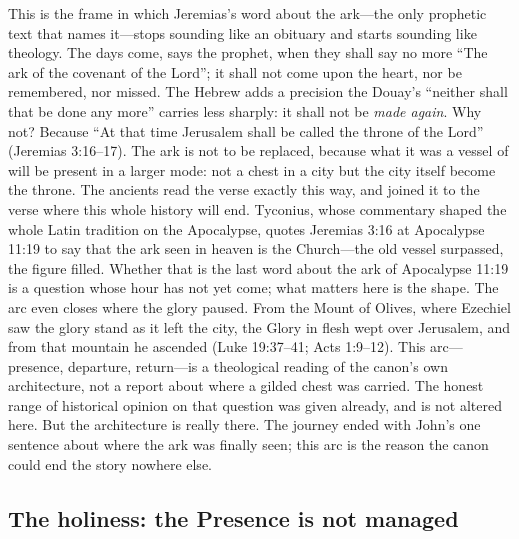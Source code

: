 This is the frame in which Jeremias's word about the ark---the only
prophetic text that names it---stops sounding like an obituary and
starts sounding like theology. The days come, says the prophet, when
they shall say no more ``The ark of the covenant of the Lord''; it
shall not come upon the heart, nor be remembered, nor missed. The
Hebrew adds a precision the Douay's ``neither shall
that be done any more'' carries less sharply: it shall not be
\emph{made again}. Why not? Because ``At that time Jerusalem shall be
called the throne of the Lord'' (Jeremias 3:16--17). The ark is not to
be replaced, because what it was a vessel of will be present in a
larger mode: not a chest in a city but the city itself become the
throne. The ancients read the verse exactly this way, and joined it to
the verse where this whole history will end. Tyconius, whose commentary shaped
the whole Latin tradition on the Apocalypse, quotes Jeremias 3:16 at
Apocalypse 11:19 to say that the ark seen in heaven is the Church---the
old vessel surpassed, the figure filled.
Whether that is the last word about the ark of Apocalypse 11:19 is a
question whose hour has not yet come; what matters here is the shape. The arc
even closes where the glory paused. From the Mount of Olives, where
Ezechiel saw the glory stand as it left the city, the Glory in flesh
wept over Jerusalem, and from that mountain he ascended (Luke
19:37--41; Acts 1:9--12). This arc---presence, departure, return---is a
theological reading of the canon's own architecture, not a report about
where a gilded chest was carried. The honest range of historical
opinion on that question was given already, and is not altered here.
But the architecture is really there. The journey ended with John's one
sentence about where the ark was finally seen; this arc is the reason
the canon could end the story nowhere else.

\subsection{The holiness: the Presence is not managed}

